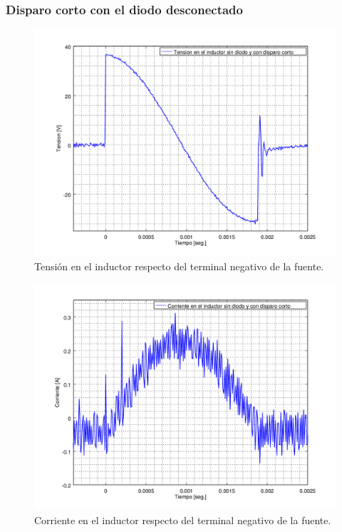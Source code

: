 \documentclass[10pt,spanish,a4paper,openany,notitlepage]{article}
\begin{document}
\subsubsection{Disparo corto con el diodo desconectado}

\begin{figure}[H]
\centering
\includegraphics[scale=0.65]{./Octave/tiristores/V_L_sin_diodo_disparo_corto.png}
\caption{Tensión en el inductor respecto del terminal negativo de la fuente.}
\label{fig:V_sin_diodo_corto}
\end{figure}

\begin{figure}[H]
\centering
\includegraphics[scale=0.65]{./Octave/tiristores/I_L_sin_diodo_disparo_corto.png}
\caption{Corriente en el inductor respecto del terminal negativo de la fuente.}
\label{fig:I_sin_diodo_corto}
\end{figure}
\end{document}
